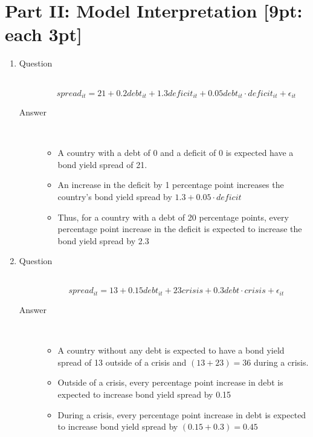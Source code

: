 \documentclass{article}
\begin{document}
\section{Part II: Model Interpretation [9pt: each 3pt]}

\begin{enumerate}
  \item
  \begin{description}
    \item[Question] \hfill \\
    \[spread_{it} = 21 + 0.2debt_{it} + 1.3deficit_{it} + 0.05debt_{it} \cdot deficit_{it} + \epsilon_{it}\]
    \item[Answer] \hfill \\
    \begin{itemize}
      \item A country with a debt of 0 and a deficit of 0 is expected have a bond yield spread of 21.
      \item An increase in the deficit by 1 percentage point increases the country's bond yield spread by \(1.3 + 0.05 \cdot deficit \) 
      \item Thus, for a country with a debt of 20 percentage points, every percentage point increase in the deficit is expected to increase the bond yield spread by 2.3
    \end{itemize}
  \end{description}
  
  \item
  \begin{description}
    \item[Question] \hfill \\
    \[ spread_{it} = 13 + 0.15debt_{it} + 23crisis + 0.3debt \cdot crisis + \epsilon_{it} \]
    \item[Answer] \hfill \\
    \begin{itemize}
      \item A country without any debt is expected to have a bond yield spread of 13 outside of a crisis and \( (13+23)=36 \) during a crisis.
      \item Outside of a crisis, every percentage point increase in debt is expected to increase bond yield spread by 0.15 
      \item During a crisis, every percentage point increase in debt is expected to increase bond yield spread by \( (0.15 + 0.3) = 0.45 \) 
    \end{itemize}
  \end{description}
  

\end{enumerate}
\end{document}
